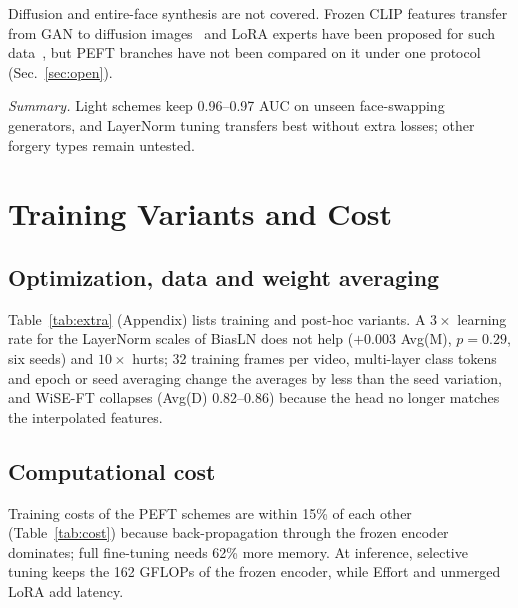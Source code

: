 \documentclass[fonts]{icst}
\begin{document}
Diffusion and entire-face synthesis are not covered. Frozen CLIP features transfer from GAN to diffusion images~\cite{ojha2023universal} and LoRA experts have been proposed for such data~\cite{liu2024mole}, but PEFT branches have not been compared on it under one protocol (Sec.~\ref{sec:open}).

\textit{Summary.} Light schemes keep 0.96--0.97 AUC on unseen face-swapping generators, and LayerNorm tuning transfers best without extra losses; other forgery types remain untested.

\section{Training Variants and Cost}
\label{sec:variants}

\subsection{Optimization, data and weight averaging}
\label{sec:extra}
Table~\ref{tab:extra} (Appendix) lists training and post-hoc variants. A $3\times$ learning rate for the LayerNorm scales of BiasLN does not help ($+0.003$ Avg(M), $p=0.29$, six seeds) and $10\times$ hurts; 32 training frames per video, multi-layer class tokens and epoch or seed averaging change the averages by less than the seed variation, and WiSE-FT collapses (Avg(D) 0.82--0.86) because the head no longer matches the interpolated features.

\subsection{Computational cost}
\label{sec:cost}
Training costs of the PEFT schemes are within 15\% of each other (Table~\ref{tab:cost}) because back-propagation through the frozen encoder dominates; full fine-tuning needs 62\% more memory. At inference, selective tuning keeps the 162 GFLOPs of the frozen encoder, while Effort and unmerged LoRA add latency.


\end{document}
